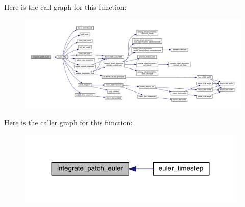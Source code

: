 Here is the call graph for this function\+:\nopagebreak
\begin{figure}[H]
\begin{center}
\leavevmode
\includegraphics[width=350pt]{euler__driver_8f90_a284012473d288e2474d9eaebf1456c2a_cgraph}
\end{center}
\end{figure}




Here is the caller graph for this function\+:\nopagebreak
\begin{figure}[H]
\begin{center}
\leavevmode
\includegraphics[width=311pt]{euler__driver_8f90_a284012473d288e2474d9eaebf1456c2a_icgraph}
\end{center}
\end{figure}


